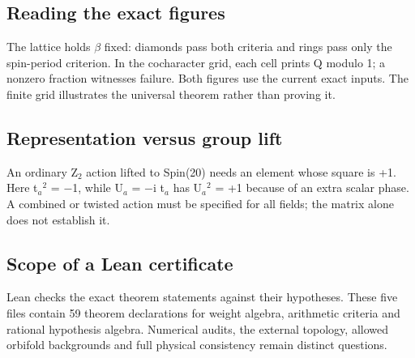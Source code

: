 \documentclass[11pt,a4paper]{article}
\begin{document}
\subsection*{Reading the exact figures}
The lattice holds \ensuremath{\beta} fixed: diamonds pass both criteria and rings pass only the spin-period criterion. In the cocharacter grid, each cell prints Q modulo 1; a nonzero fraction witnesses failure. Both figures use the current exact inputs. The finite grid illustrates the universal theorem rather than proving it.

\subsection*{Representation versus group lift}
An ordinary Z\ensuremath{{}_{2}} action lifted to Spin(20) needs an element whose square is +1. Here t\ensuremath{{}_{a}}\ensuremath{{}^{2}} = \ensuremath{-}1, while U\ensuremath{{}_{a}} = \ensuremath{-}i t\ensuremath{{}_{a}} has U\ensuremath{{}_{a}}\ensuremath{{}^{2}} = +1 because of an extra scalar phase. A combined or twisted action must be specified for all fields; the matrix alone does not establish it.

\subsection*{Scope of a Lean certificate}
Lean checks the exact theorem statements against their hypotheses. These five files contain 59 theorem declarations for weight algebra, arithmetic criteria and rational hypothesis algebra. Numerical audits, the external topology, allowed orbifold backgrounds and full physical consistency remain distinct questions.
\end{document}
